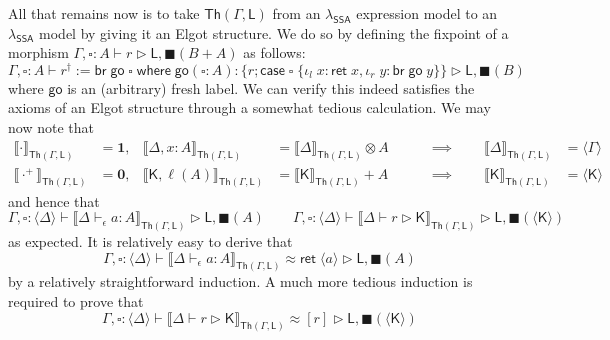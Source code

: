 \documentclass[acmsmall,screen,review]{acmart}
\newcommand{\mb}[1]{\ensuremath{\mathbf{#1}}}
\newcommand{\ms}[1]{\ensuremath{\mathsf{#1}}}
\newcommand{\lto}{:}
\newcommand{\linl}[1]{\iota_l\;{#1}}
\newcommand{\linr}[1]{\iota_r\;{#1}}
\newcommand{\casestmt}[5]{\ms{case}\;#1\;\{\linl{#2} \lto #3, \linr{#4} \lto #5\}}
\newcommand{\where}[2]{#1\;\ms{where}\;#2}
\newcommand{\wbranch}[3]{#1(#2) \lto \{#3\}}
\newcommand{\bhyp}[2]{#1 : #2}
\newcommand{\hasty}[4]{#1 \vdash_{#2} #3: {#4}}
\newcommand{\haslb}[3]{#1 \vdash #2 \rhd #3}
\newcommand{\teqv}{\approx}
\newcommand{\lbeq}[4]{#1 \vdash #2 \teqv #3 \rhd {#4}}
\newcommand{\dnt}[1]{\llbracket{#1}\rrbracket}
\newcommand{\invar}{\square}
\newcommand{\outlb}{\blacksquare}
\newcommand{\pckd}[1]{\langle #1 \rangle}
\newcommand{\isotopessa}{\(\lambda_{\ms{SSA}}\)}
\begin{document}
All that remains now is to take $\ms{Th}(\Gamma, \ms{L})$ from an \isotopessa{} expression model
to an \isotopessa{} model by giving it an Elgot structure. We do so by defining the fixpoint
of a morphism $\haslb{\Gamma, \invar : A}{r}{\ms{L}, \outlb(B + A)}$ as follows:
\begin{equation}
  \haslb{\Gamma, \invar : A}
    {r^\dagger := \where{\ms{br}\;\ms{go}\;\invar}{\wbranch{\ms{go}}{\invar : A}
        {r ; \casestmt{\invar}{x}{\ms{ret}\;x}{y}{\ms{br}\;\ms{go}\;y}}}}
    {\ms{L}, \outlb(B)}
\end{equation}
where $\ms{go}$ is an (arbitrary) fresh label. We can verify this indeed satisfies the axioms of
an Elgot structure through a somewhat tedious calculation. We may now note that
\begin{equation}
  \begin{aligned}
    \dnt{\cdot}_{\ms{Th}(\Gamma, \ms{L})} 
      &= \mb{1}, &
    \dnt{\Delta, \bhyp{x}{A}}_{\ms{Th}(\Gamma, \ms{L})} 
      &= \dnt{\Delta}_{\ms{Th}(\Gamma, \ms{L})} \otimes A
    &\qquad \implies \qquad
    \dnt{\Delta}_{\ms{Th}(\Gamma, \ms{L})} &= \pckd{\Gamma} \\
    \dnt{\cdot^+}_{\ms{Th}(\Gamma, \ms{L})} &= \mb{0}, &
    \dnt{\ms{K}, \ell(A)}_{\ms{Th}(\Gamma, \ms{L})} 
      &= \dnt{\ms{K}}_{\ms{Th}(\Gamma, \ms{L})} + A
    &\qquad \implies \qquad
    \dnt{\ms{K}}_{\ms{Th}(\Gamma, \ms{L})} &= \pckd{\ms{K}}
  \end{aligned}
\end{equation}
and hence that 
\begin{equation*}
  \haslb{\Gamma, \invar : \pckd{\Delta}}
        {\dnt{\hasty{\Delta}{\epsilon}{a}{A}}_{\ms{Th}(\Gamma, \ms{L})}}{\ms{L}, \outlb(A)}
      \qquad
  \haslb{\Gamma, \invar : \pckd{\Delta}}
    {\dnt{\haslb{\Delta}{r}{\ms{K}}}_{\ms{Th}(\Gamma, \ms{L})}}{\ms{L}, \outlb(\pckd{\ms{K}})}
\end{equation*}
as expected. It is relatively easy to derive that
\begin{equation*}
  \lbeq{\Gamma, \invar : \pckd{\Delta}}
        {\dnt{\hasty{\Delta}{\epsilon}{a}{A}}_{\ms{Th}(\Gamma, \ms{L})}}
        {\ms{ret}\;\pckd{a}}
        {\ms{L}, \outlb(A)}
\end{equation*}
by a relatively straightforward induction. A much more tedious induction is required to prove that
\begin{equation*}
  \lbeq{\Gamma, \invar : \pckd{\Delta}}
        {\dnt{\haslb{\Delta}{r}{\ms{K}}}_{\ms{Th}(\Gamma, \ms{L})}}
        {[r]}
        {\ms{L}, \outlb(\pckd{\ms{K}})}
\end{equation*}
\end{document}
